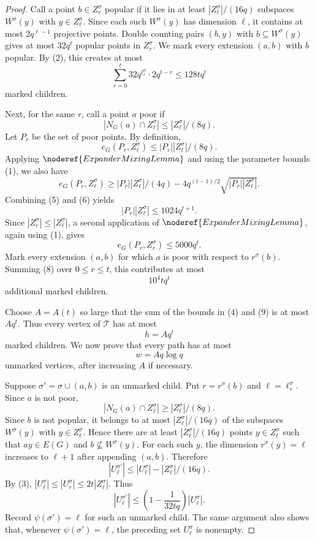 \begin{proof}
Call a point \(b\in Z_r^\sigma\) popular if it lies in at least
\(|Z_\ell^\sigma|/(16q)\) subspaces \(W^\sigma(y)\) with
\(y\in Z_\ell^\sigma\).  Since each such \(W^\sigma(y)\) has dimension
\(\ell\), it contains at most \(2q^{\ell-1}\) projective points.  Double
counting pairs \((b,y)\) with \(b\subseteq W^\sigma(y)\) gives at most
\(32q^\ell\) popular points in \(Z_r^\sigma\).  We mark every extension
\((a,b)\) with \(b\) popular.  By (2), this creates at most
\[
  \sum_{r=0}^t 32q^{\ell_r^\sigma}\cdot 2q^{t-r}
  \le 128tq^t \tag{4}
\]
marked children.

Next, for the same \(r\), call a point \(a\) poor if
\[
  |N_G(a)\cap Z_\ell^\sigma|\le |Z_\ell^\sigma|/(8q).
\]
Let \(P_r\) be the set of poor points.  By definition,
\[
  e_G(P_r,Z_\ell^\sigma)\le |P_r||Z_\ell^\sigma|/(8q). \tag{5}
\]
Applying \(\noderef{ExpanderMixingLemma}\) and using the parameter bounds
(1), we also have
\[
  e_G(P_r,Z_\ell^\sigma)
  \ge |P_r||Z_\ell^\sigma|/(4q)
       -4q^{(t-1)/2}\sqrt{|P_r||Z_\ell^\sigma|}. \tag{6}
\]
Combining (5) and (6) yields
\[
  |P_r||Z_\ell^\sigma|\le 1024q^{t+1}. \tag{7}
\]
Since \(|Z_r^\sigma|\le |Z_\ell^\sigma|\), a second application of
\(\noderef{ExpanderMixingLemma}\), again using (1), gives
\[
  e_G(P_r,Z_r^\sigma)\le 5000q^t. \tag{8}
\]
Mark every extension \((a,b)\) for which \(a\) is poor with respect to
\(r^\sigma(b)\).  Summing (8) over \(0\le r\le t\), this contributes at most
\[
  10^4tq^t \tag{9}
\]
additional marked children.

Choose \(A=A(t)\) so large that the sum of the bounds in (4) and (9) is at
most \(Aq^t\).  Thus every vertex of \(\mathcal T\) has at most
\[
  h=Aq^t
\]
marked children.  We now prove that every path has at most
\[
  w=Aq\log q
\]
unmarked vertices, after increasing \(A\) if necessary.

Suppose \(\sigma'=\sigma\cup(a,b)\) is an unmarked child.  Put
\(r=r^\sigma(b)\) and \(\ell=\ell_r^\sigma\).  Since \(a\) is not poor,
\[
  |N_G(a)\cap Z_\ell^\sigma|\ge |Z_\ell^\sigma|/(8q).
\]
Since \(b\) is not popular, it belongs to at most
\(|Z_\ell^\sigma|/(16q)\) of the subspaces \(W^\sigma(y)\) with
\(y\in Z_\ell^\sigma\).  Hence there are at least
\(|Z_\ell^\sigma|/(16q)\) points \(y\in Z_\ell^\sigma\) such that
\(ay\in E(G)\) and \(b\not\subseteq W^\sigma(y)\).  For each such \(y\),
the dimension \(r^\sigma(y)=\ell\) increases to \(\ell+1\) after appending
\((a,b)\).  Therefore
\[
  |U_\ell^{\sigma'}|
  \le |U_\ell^\sigma|-|Z_\ell^\sigma|/(16q). \tag{10}
\]
By (3), \( |U_\ell^\sigma|\le |U_r^\sigma|\le 2t|Z_\ell^\sigma|\).  Thus
\[
  |U_\ell^{\sigma'}|
  \le \left(1-\frac1{32tq}\right)|U_\ell^\sigma|. \tag{11}
\]
Record \(\psi(\sigma')=\ell\) for such an unmarked child.  The same argument
also shows that, whenever \(\psi(\sigma')=\ell\), the preceding set
\(U_\ell^\sigma\) is nonempty.


\end{proof}

